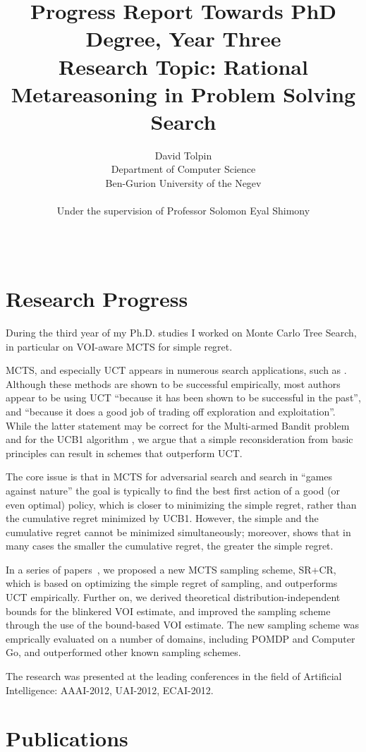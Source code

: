 \documentclass[]{article}
\title{Progress Report Towards PhD Degree, Year Three\\
  Research Topic: Rational Metareasoning in Problem Solving Search}
\author{David Tolpin\\
        Department of Computer Science\\
        Ben-Gurion University of the Negev\\
        \\
        Under the supervision of Professor Solomon Eyal Shimony\\
        \\
      \\}
\begin{document}
\maketitle

\section{Research Progress}

During the third year of my Ph.D. studies I worked on Monte Carlo Tree
Search, in particular on VOI-aware MCTS for simple regret.

MCTS, and especially UCT \cite{Kocsis.uct} appears in numerous search
applications, such as \cite{Eyerich.ctp}. Although these methods are
shown to be successful empirically, most authors appear to be using
UCT ``because it has been shown to be successful in the past'', and
``because it does a good job of trading off exploration and
exploitation''. While the latter statement may be correct for the
Multi-armed Bandit problem and for the UCB1 algorithm \cite{Auer.ucb},
we argue that a simple reconsideration from basic principles can
result in schemes that outperform UCT.

The core issue is that in MCTS for adversarial search and search in
``games against nature'' the goal is typically to find the best
first action of a good (or even optimal) policy, which is closer to
minimizing the simple regret, rather than the cumulative regret
minimized by UCB1.  However, the simple and the cumulative regret
cannot be minimized simultaneously; moreover, \cite{Bubeck.pure} shows
that in many cases the smaller the cumulative regret, the greater the
simple regret.

In a series of
papers~\cite{TolpinShimony.mcts,HayRussellTolpinShimony.selecting,TolpinShimony.voiaware},
we proposed a new MCTS sampling scheme, SR+CR, which is based on
optimizing the simple regret of sampling, and outperforms UCT
empirically. Further on, we derived theoretical
distribution-independent bounds for the blinkered VOI estimate, and
improved the sampling scheme through the use of the bound-based VOI
estimate. The new sampling scheme was emprically evaluated on a number
of domains, including POMDP and Computer Go, and outperformed other
known sampling schemes.

The research was presented at the leading conferences in the field
of Artificial Intelligence: AAAI-2012, UAI-2012, ECAI-2012.

\section{Publications}



\end{document}
